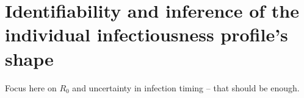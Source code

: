\section{Identifiability and inference of the individual infectiousness profile's shape}

Focus here on $R_0$ and uncertainty in infection timing -- that should be enough. 